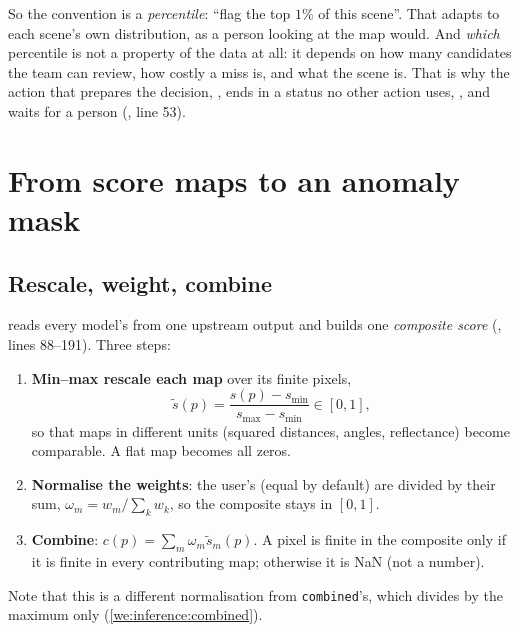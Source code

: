 So the convention is a \emph{percentile}: ``flag the top $1\%$ of this scene''.
That adapts to each scene's own distribution, as a person looking at the map would. And \emph{which}
percentile is not a property of the data at all: it depends on how many candidates the team can review, how
costly a miss is, and what the scene is. That is why the action that prepares the decision,
, ends in a status no other action uses, , and waits for a
person (, line 53).

\section{From score maps to an anomaly mask}\label{sec:material:mask}

\subsection{Rescale, weight, combine}

 reads every model's  from one upstream
 output and builds one \emph{composite score}
(, lines 88--191). Three steps:
\begin{enumerate}
\item \textbf{Min--max rescale each map} over its finite pixels,
  \begin{equation}
  \tilde{s}(p)=\frac{s(p)-s_{\min}}{s_{\max}-s_{\min}}\in[0,1],
  \end{equation}
  so that maps in different units (squared distances, angles, reflectance) become comparable. A flat map
  becomes all zeros.
\item \textbf{Normalise the weights}: the user's  (equal by default) are divided by
  their sum, $\omega_m=w_m/\sum_k w_k$, so the composite stays in $[0,1]$.
\item \textbf{Combine}: $c(p)=\sum_m\omega_m\tilde{s}_m(p)$. A pixel is finite in the composite only if it is
  finite in every contributing map; otherwise it is NaN (not a number).
\end{enumerate}
Note that this is a different normalisation from \texttt{combined}'s, which divides by the maximum only
(\cref{we:inference:combined}).

